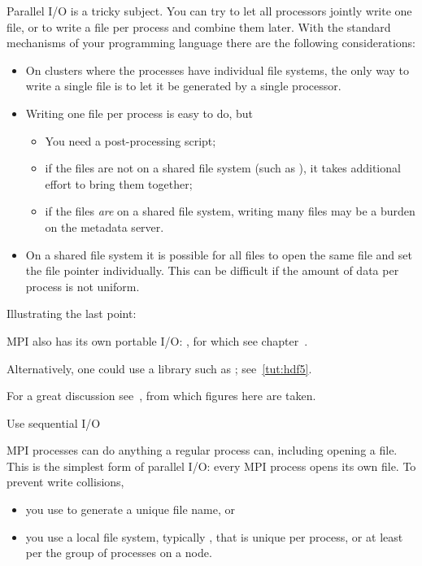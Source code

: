 
Parallel I/O is a tricky subject. You can try to let all processors
jointly write one file, or to write a file per process and combine
them later. With the standard mechanisms of your programming language
there are the following considerations:
\begin{itemize}
\item On clusters where the processes have individual file systems,
  the only way to write a single file is to let it be generated by a
  single processor.
\item Writing one file per process is easy to do, but
  \begin{itemize}
  \item You need a post-processing script;
  \item if the files are not on a shared file system (such as
    ), it takes additional effort to bring them
    together;
  \item if the files \emph{are} on a shared file system, writing many
    files may be a burden on the metadata server.
  \end{itemize}
\item On a shared file system it is possible for all files to open the
  same file and set the file pointer individually. This can be
  difficult if the amount of data per process is not uniform.
\end{itemize}
Illustrating the last point:
\begingroup\renewcommand\codesnippetsdir{snippets.pcse}
\endgroup

MPI also has its own portable I/O: , for which
see chapter~.

Alternatively, one could use a library such as ;
see~\ref{tut:hdf5}.

For a great discussion see~\cite{Mendez:ParallelIOpage},
from which figures here are taken.

 {Use sequential I/O}

MPI processes can do anything a regular process can,
including opening a file.
This is the simplest form of parallel I/O:
every MPI process opens its own file.
To prevent write collisions,
\begin{itemize}
\item you use  to generate a unique file name, or
\item you use a local file system, typically , that is unique
  per process, or at least per the group of processes on a node.
\end{itemize}

